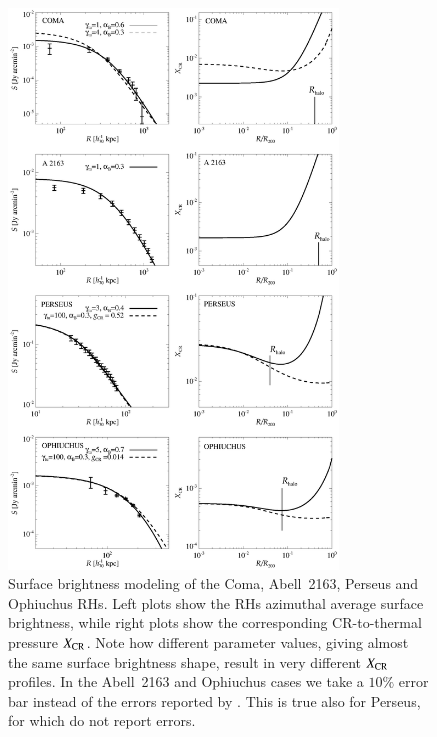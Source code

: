 \documentclass[traditabstract]{aa}
\begin{document}
\begin{figure}[t]
\centering
\includegraphics[width=0.78\textwidth]{figures/SB_profiles_ALL.eps}
\caption{Surface brightness modeling of the Coma, Abell~2163, Perseus and Ophiuchus RHs. Left plots show the RHs azimuthal average surface brightness, while right plots show the corresponding CR-to-thermal pressure $X_{\rm{CR}}$. Note how different parameter values, giving almost the same surface brightness shape, result in very different $X_{\rm{CR}}$ profiles. In the Abell~2163 and Ophiuchus cases we take a $10\%$ error bar instead of the errors reported by \cite{2009A&A...499..679M}. This is true also for Perseus, for which \cite{1990MNRAS.246..477P} do not report errors.}
\label{fig:SBmodeling}
\end{figure}
\end{document}
